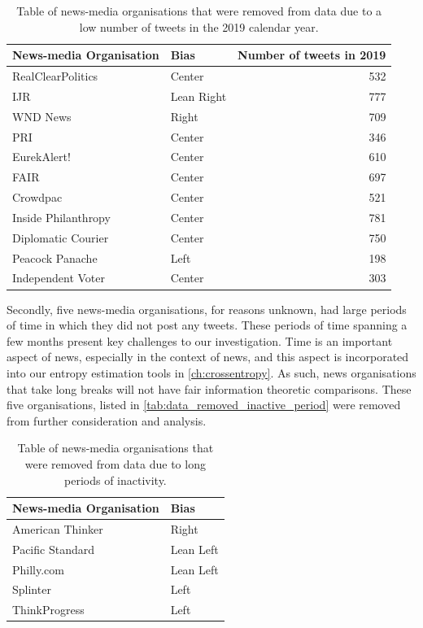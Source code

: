\begin{table}[!htbp]
	\centering
	\begin{tabular}{llr}
		\toprule
		News-media Organisation &    Bias  &  Number of tweets in 2019\\
		\midrule
		RealClearPolitics &      Center &  532 \\
		IJR  &  Lean Right &  777 \\
		WND News &         Right &  709 \\
		PRI &                Center &  346 \\
		EurekAlert! &            Center &  610 \\
		FAIR &     Center &  697 \\
		Crowdpac &            Center &  521 \\
		Inside Philanthropy &        Center &  781 \\
		Diplomatic Courier &         Center &  750 \\
		Peacock Panache &          Left &  198 \\
		Independent Voter &            Center &  303 \\
		\bottomrule
	\end{tabular}
\caption{Table of news-media organisations that were removed from data due to a low number of tweets in the 2019 calendar year.}
\label{tab:data_removed_low_tweet_counts}
\end{table}

Secondly, five news-media organisations, for reasons unknown, had large periods of time in which they did not post any tweets. These periods of time spanning a few months present key challenges to our investigation. 
Time is an important aspect of news, especially in the context of news, and this aspect is incorporated into our entropy estimation tools in \autoref{ch:crossentropy}. As such, news organisations that take long breaks will not have fair information theoretic comparisons. These five organisations, listed in \autoref{tab:data_removed_inactive_period} were removed from further consideration and analysis.

\begin{table}[!htbp]
	\centering
	\begin{tabular}{ll}
		\toprule
		News-media Organisation &    Bias \\
		\midrule
		American Thinker  &      Right \\
		Pacific Standard &  Lean Left \\
		Philly.com  &  Lean Left \\
		Splinter &       Left \\
		ThinkProgress  &       Left \\
		\bottomrule
	\end{tabular}
	\caption{Table of news-media organisations that were removed from data due to long periods of inactivity.}
	\label{tab:data_removed_inactive_period}
\end{table}


